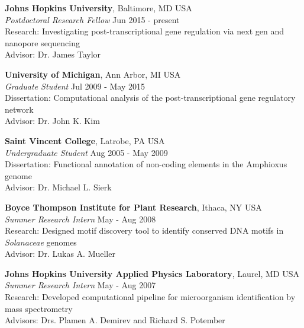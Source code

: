 \documentclass[margin,line]{res}
\begin{document}
\begin{resume}
{\bf Johns Hopkins University}, Baltimore, MD USA\\
{\em Postdoctoral Research Fellow} \hfill {Jun 2015 - present}\\
Research: Investigating post-transcriptional gene regulation via next gen and nanopore sequencing\\
Advisor:  Dr. James Taylor

{\bf University of Michigan}, Ann Arbor, MI USA\\
{\em Graduate Student} \hfill {Jul 2009 - May 2015}\\
Dissertation: Computational analysis of the post-transcriptional gene regulatory network\\
Advisor:  Dr. John K. Kim

{\bf Saint Vincent College}, Latrobe, PA USA\\
{\em Undergraduate Student} \hfill {Aug 2005 - May 2009}\\
Dissertation: Functional annotation of non-coding elements in the Amphioxus genome\\
Advisor:  Dr. Michael L. Sierk

{\bf Boyce Thompson Institute for Plant Research}, Ithaca, NY USA\\
{\em Summer Research Intern} \hfill {May - Aug 2008}\\
Research: Designed motif discovery tool to identify conserved DNA motifs in {\em Solanaceae} genomes\\
Advisor: Dr. Lukas A. Mueller

{\bf Johns Hopkins University Applied Physics Laboratory}, Laurel, MD USA\\
{\em Summer Research Intern} \hfill {May - Aug 2007}\\
Research: Developed computational pipeline for microorganism identification by mass spectrometry\\
Advisors: Drs. Plamen A. Demirev and Richard S. Potember



\end{resume}
\end{document}
